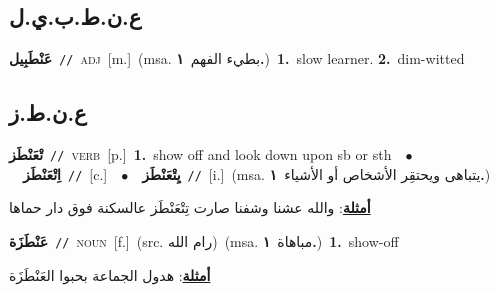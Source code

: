 \documentclass[10pt,a4paper,twoside]{article} %
\begin{document}
\begin{multicols}{2}
\vspace{-3mm}
\subsection*{\color{blue}\foreignlanguage{arabic}{ع.ن.ط.ب.ي.ل}\color{blue}{ (ntws)}} 

{\setlength\topsep{0pt}\textbf{\foreignlanguage{arabic}{عَنْطَبِيل}}\ {\color{gray}\texttt{//}\color{black}}\ \textsc{adj}\ [m.]\ \color{gray}(msa. \foreignlanguage{arabic}{بطيء الفهم}~\foreignlanguage{arabic}{\textbf{١.}})\color{black}\ \textbf{1.}~slow learner.  \textbf{2.}~dim-witted\ } \vspace{2mm}

\vspace{-3mm}
\subsection*{\color{blue}\foreignlanguage{arabic}{ع.ن.ط.ز}\color{blue}{}} 

{\setlength\topsep{0pt}\textbf{\foreignlanguage{arabic}{تْعَنْطَز}}\ {\color{gray}\texttt{//}\color{black}}\ \textsc{verb}\ [p.]\ \textbf{1.}~show off and look down upon sb or sth\ \ $\bullet$\ \ \setlength\topsep{0pt}\textbf{\foreignlanguage{arabic}{اِتْعَنْطَز}}\ {\color{gray}\texttt{//}\color{black}}\ [c.]\ \ $\bullet$\ \ \setlength\topsep{0pt}\textbf{\foreignlanguage{arabic}{يِتْعَنْطَز}}\ {\color{gray}\texttt{//}\color{black}}\ [i.]\ \color{gray}(msa. \foreignlanguage{arabic}{يتباهى ويحتقِر الأشخاص أو الأشياء}~\foreignlanguage{arabic}{\textbf{١.}})\color{black}\  \begin{flushright}\color{gray}\foreignlanguage{arabic}{\textbf{\underline{\foreignlanguage{arabic}{أمثلة}}}: والله عشنا وشفنا صارت تِتْعَنْطَز عالسكنة فوق دار حماها}\end{flushright}\color{black}} \vspace{2mm}

{\setlength\topsep{0pt}\textbf{\foreignlanguage{arabic}{عَنْطَزَة}}\ {\color{gray}\texttt{//}\color{black}}\ \textsc{noun}\ [f.]\ (src. \color{gray}\foreignlanguage{arabic}{رام الله}\color{black})\ \color{gray}(msa. \foreignlanguage{arabic}{مباهاة}~\foreignlanguage{arabic}{\textbf{١.}})\color{black}\ \textbf{1.}~show-off\  \begin{flushright}\color{gray}\foreignlanguage{arabic}{\textbf{\underline{\foreignlanguage{arabic}{أمثلة}}}: هدول الجماعة بحبوا العَنْطَزَة}\end{flushright}\color{black}} \vspace{2mm}


\end{multicols}
\end{document}
